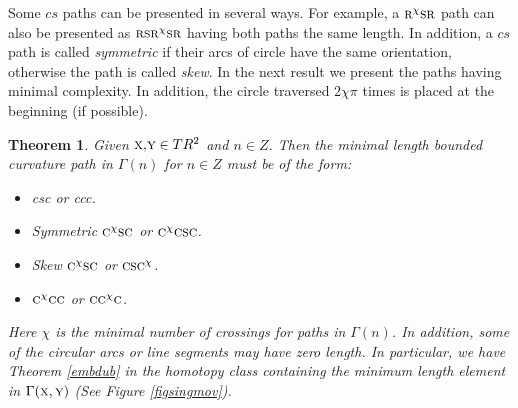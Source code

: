 \documentclass{amsart}
\newtheorem{theorem}{Theorem}[section]
\theoremstyle{definition}
\theoremstyle{remark}
\numberwithin{equation}{section}
\begin{document}
 Some $cs$ paths can be presented in several ways. For example, a $\mbox{\sc r}^{\chi } \mbox{\sc s}\mbox{\sc r}$ path can also be presented as $\mbox{\sc r} \mbox{\sc s}\mbox{\sc r}^{\chi }\mbox{\sc s}\mbox{\sc r}$ having both paths the same length. In addition, a $cs$ path is called {\it symmetric} if their arcs of circle have the same orientation, otherwise the path is called {\it skew}. In the next result we present the paths having minimal complexity. In addition, the circle traversed $2 \chi  \pi $ times is placed at the beginning (if possible). 

\begin{theorem} \label{singudub} Given $\mbox{\sc x,y} \in T{R}^2$ and $n\in { Z}$. Then the minimal length bounded curvature path in $\Gamma(n)$ for $n\in {Z}$ must be of the form:

\begin{itemize}
\item {\sc csc} or {\sc ccc}.
\item Symmetric $\mbox{\sc c}^\chi \mbox{\sc s}\mbox{\sc c}$ or $\mbox{\sc c}^{\chi}\mbox{\sc c} \mbox{\sc s}\mbox{\sc c}$.
\item Skew $\mbox{\sc c}^{\chi}\mbox{\sc s}\mbox{\sc c}$ or  $\mbox{\sc c}\mbox{\sc s}\mbox{\sc c}^{\chi}$.
\item $\mbox{\sc c}^\chi \mbox{\sc c}\mbox{\sc c}$ or $\mbox{\sc c} \mbox{\sc c}^{\chi}\mbox{\sc c}$.
 \end{itemize}
Here $\chi$ is the minimal number of crossings for paths in $\Gamma(n)$. In addition, some of the circular arcs or line segments may have zero length. In particular, we have Theorem \ref{embdub} in the homotopy class containing the minimum length element in $\Gamma(\mbox{\sc x},\mbox{\sc y})$ (See Figure \ref{figsingmov}).
\end{theorem}
\end{document}
